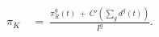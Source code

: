 \begin{equation}
\begin{split}
    \pi_{K} \ 
    & = \ \frac{\pi_{R}^{g}(t) \ + \ C'\left( \sum_{g} d^{g}(t) \right)}{I^{g}}.
\end{split}
\label{Equation:AKS-Style-Model_Necessary-Conditions_Simplified-pi-K}
\end{equation}
